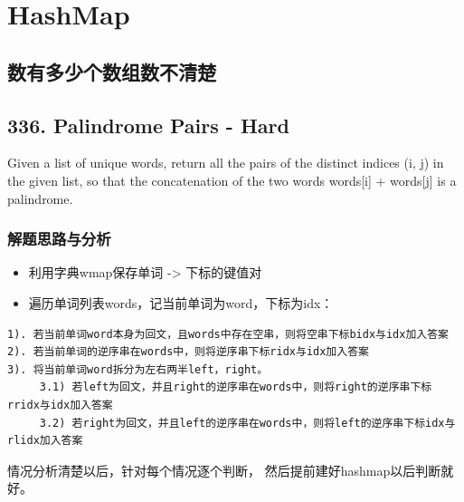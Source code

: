 \documentclass[9pt, b5paaper]{book}
\begin{document}
\chapter{HashMap}
\label{sec-3}
\section{数有多少个数组数不清楚}
\label{sec-3-1}
\section{336. Palindrome Pairs - Hard}
\label{sec-3-2}
Given a list of unique words, return all the pairs of the distinct indices (i, j) in the given list, so that the concatenation of the two words words[i] + words[j] is a palindrome.
\subsection{解题思路与分析}
\label{sec-3-2-1}
\begin{itemize}
\item 利用字典wmap保存单词 -> 下标的键值对
\item 遍历单词列表words，记当前单词为word，下标为idx：
\end{itemize}
\begin{verbatim}
1). 若当前单词word本身为回文，且words中存在空串，则将空串下标bidx与idx加入答案
2). 若当前单词的逆序串在words中，则将逆序串下标ridx与idx加入答案
3). 将当前单词word拆分为左右两半left，right。
     3.1) 若left为回文，并且right的逆序串在words中，则将right的逆序串下标rridx与idx加入答案
     3.2) 若right为回文，并且left的逆序串在words中，则将left的逆序串下标idx与rlidx加入答案
\end{verbatim}

情况分析清楚以后，针对每个情况逐个判断， 然后提前建好hashmap以后判断就好。
\end{document}
